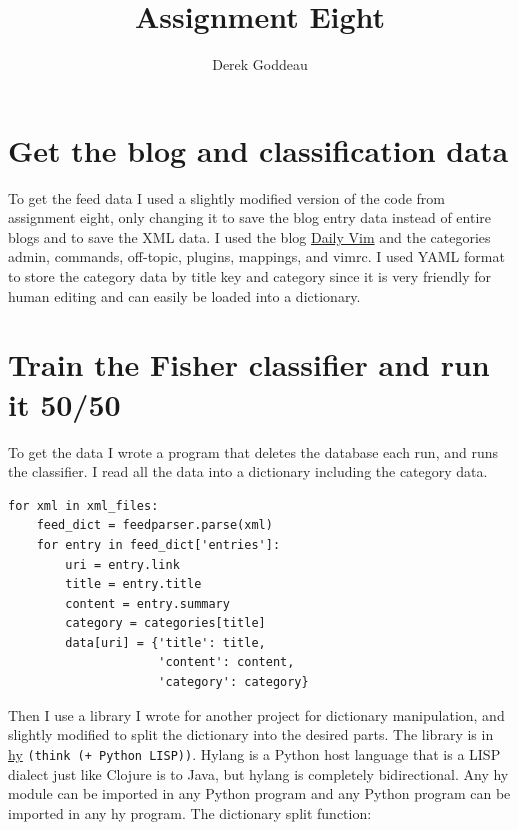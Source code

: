 \documentclass[12pt, a4paper]{article}
\author{Derek Goddeau}
\title{Assignment Eight}
\newcommand{\code}[1]{\texttt{#1}}
\begin{document}
\maketitle

\newpage



\section{Get the blog and classification data}
 
To get the feed data I used a slightly modified version of the code from assignment eight, only changing it to save the blog entry data instead of entire blogs and to save the XML data. I used the blog \href{http://dailyvim.blogspot.com/}{Daily Vim} and the categories admin, commands, off-topic, plugins, mappings, and vimrc. I used YAML format to store the category data by title key and category since it is very friendly for human editing and can easily be loaded into a dictionary.

\section{Train the Fisher classifier and run it 50/50}

To get the data I wrote a program that deletes the database each run, and runs the classifier. I read all the data into a dictionary including the category data.

\begin{minipage}{\linewidth} %
\vspace{2em}
\begin{verbatim}
for xml in xml_files:
    feed_dict = feedparser.parse(xml)
    for entry in feed_dict['entries']:
        uri = entry.link
        title = entry.title
        content = entry.summary
        category = categories[title]
        data[uri] = {'title': title,
                     'content': content,
                     'category': category}
\end{verbatim}
\vspace{2em}
\end{minipage}

\newpage
Then I use a library I wrote for another project for dictionary manipulation, and slightly modified to split the dictionary into the desired parts. The library is in \href{https://github.com/hylang/hy}{hy} \code{(think (+ Python LISP))}. Hylang is a Python host language that is a LISP dialect just like Clojure is to Java, but hylang is completely bidirectional. Any hy module can be imported in any Python program and any Python program can be imported in any hy program. The dictionary split function:
\end{document}

